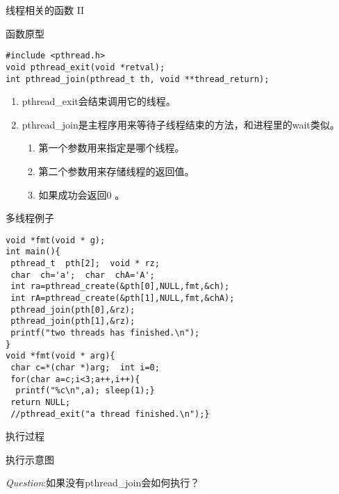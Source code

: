 \documentclass{beamer}
\begin{document}
\begin{frame}[fragile]{线程相关的函数 II}
\begin{block}{函数原型}
\begin{verbatim}
#include <pthread.h>
void pthread_exit(void *retval);
int pthread_join(pthread_t th, void **thread_return);
\end{verbatim}
\begin{enumerate}
\item
pthread\_exit会结束调用它的线程。
\item
pthread\_join是主程序用来等待子线程结束的方法，和进程里的wait类似。
\begin{enumerate}
\item
第一个参数用来指定是哪个线程。
\item
第二个参数用来存储线程的返回值。
\item
如果成功会返回0 。
\end{enumerate}
\end{enumerate}
\end{block}
\end{frame}
\begin{frame}[fragile]{多线程例子}
\begin{verbatim}
void *fmt(void * g);
int main(){
 pthread_t  pth[2];  void * rz;
 char  ch='a';  char  chA='A';
 int ra=pthread_create(&pth[0],NULL,fmt,&ch);
 int rA=pthread_create(&pth[1],NULL,fmt,&chA);
 pthread_join(pth[0],&rz);
 pthread_join(pth[1],&rz);
 printf("two threads has finished.\n");	
}
void *fmt(void * arg){
 char c=*(char *)arg;  int i=0;
 for(char a=c;i<3;a++,i++){
  printf("%c\n",a); sleep(1);}
 return NULL; 
 //pthread_exit("a thread finished.\n");}
\end{verbatim}
\end{frame}
\begin{frame}{执行过程}
\begin{block}{执行示意图}
\end{block}
\emph{Question}:如果没有pthread\_join会如何执行？
\end{frame}
\end{document}
